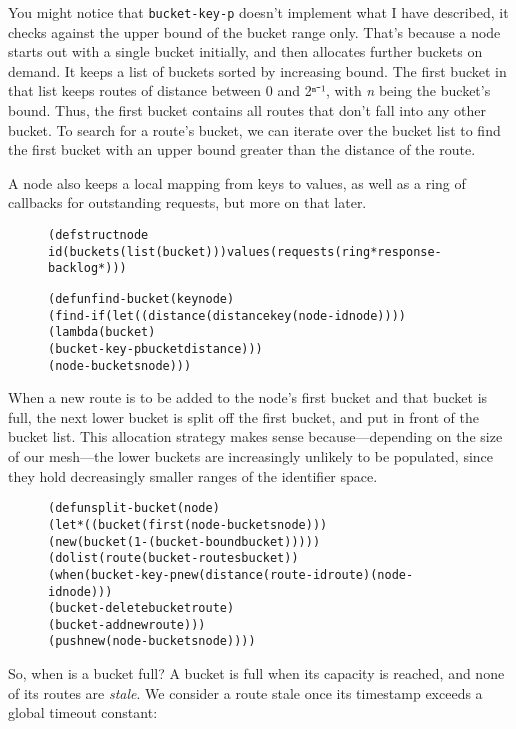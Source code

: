 \documentclass [a4paper,12pt,oneside]{article}\usepackage [paper=a4paper,left=37.5264mm,right=37.5264mm,top=37.5264mm,bottom=37.5264mm]{geometry}\usepackage {graphicx}\usepackage {tabularx}\usepackage {alltt}\usepackage {float}\usepackage [section]{placeins}\usepackage {titling}\setlength {\droptitle }{-4em}\pretitle {\begin {flushright}\bfseries \LARGE }\posttitle {\end {flushright}}\preauthor {\begin {flushright}}\postauthor {\end {flushright}}\predate {\begin {flushright}}\postdate {\end {flushright}}\usepackage [english]{babel}\usepackage [T1]{fontenc}\usepackage [utf8x]{inputenc}\usepackage {stmaryrd}\usepackage {amsfonts}\DeclareUnicodeCharacter {12314}{$\llbracket $}\DeclareUnicodeCharacter {12315}{$\rrbracket $}\DeclareUnicodeCharacter {9655}{$\rhd $}\newcommand \nobreakdash {\mbox {-}}\DeclareUnicodeCharacter {8209}{\nobreakdash }\usepackage [sc]{mathpazo}\linespread {1.05}\usepackage [font={small},labelformat=empty,labelsep=none]{caption}\tolerance=10000 \clubpenalty=10000 \widowpenalty=10000 \frenchspacing
\begin{document}
You might notice that \texttt {bucket-key-p} doesn’t implement what I have described, it checks against the upper bound of the bucket range only. That’s because a node starts out with a single bucket initially, and then allocates further buckets on demand. It keeps a list of buckets sorted by increasing bound. The first bucket in that list keeps routes of distance between 0 and 2ⁿ⁻¹, with \textit {n} being the bucket’s bound. Thus, the first bucket contains all routes that don’t fall into any other bucket. To search for a route’s bucket, we can iterate over the bucket list to find the first bucket with an upper bound greater than the distance of the route.

A node also keeps a local mapping from keys to values, as well as a ring of callbacks for outstanding requests, but more on that later.

\begin {figure}[H]\centering \begin {alltt}
(defstruct node
  id (buckets (list (bucket))) values (requests (ring *response-backlog*)))

(defun find-bucket (key node)
  (find-if (let ((distance (distance key (node-id node))))
             (lambda (bucket)
               (bucket-key-p bucket distance)))
           (node-buckets node)))
\end{alltt}\vspace {-1em}\end {figure}

When a new route is to be added to the node’s first bucket and that bucket is full, the next lower bucket is split off the first bucket, and put in front of the bucket list. This allocation strategy makes sense because—depending on the size of our mesh—the lower buckets are increasingly unlikely to be populated, since they hold decreasingly smaller ranges of the identifier space.

\begin {figure}[H]\centering \begin {alltt}
(defun split-bucket (node)
  (let* ((bucket (first (node-buckets node)))
         (new (bucket (1- (bucket-bound bucket)))))
    (dolist (route (bucket-routes bucket))
      (when (bucket-key-p new (distance (route-id route) (node-id node)))
        (bucket-delete bucket route)
        (bucket-add new route)))
    (push new (node-buckets node))))
\end{alltt}\vspace {-1em}\end {figure}

So, when is a bucket full? A bucket is full when its capacity is reached, and none of its routes are \textit {stale}. We consider a route stale once its timestamp exceeds a global timeout constant:
\end{document}
